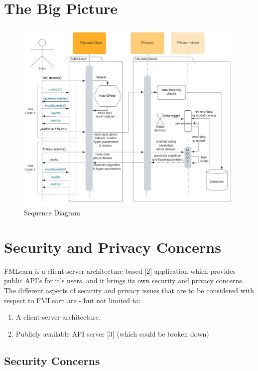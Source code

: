 \section{The Big Picture}



\begin{figure}[H]
    \centering
    \includegraphics[width=15cm]{images/Sequence Diagram.jpeg}
    \caption{Sequence Diagram}
    \label{sequence-diagram}
\end{figure}


\section{Security and Privacy Concerns}
FMLearn is a client-server architecture-based [2] application which provides public API’s for it's users, and it brings its own security and privacy concerns. The different aspects of security and privacy issues that are to be considered with respect to FMLearn are - but not limited to:

\begin{enumerate}
    \item A client-server architecture.
    \item Publicly available API server [3] (which could be broken down)
\end{enumerate}

\subsection{Security Concerns}

